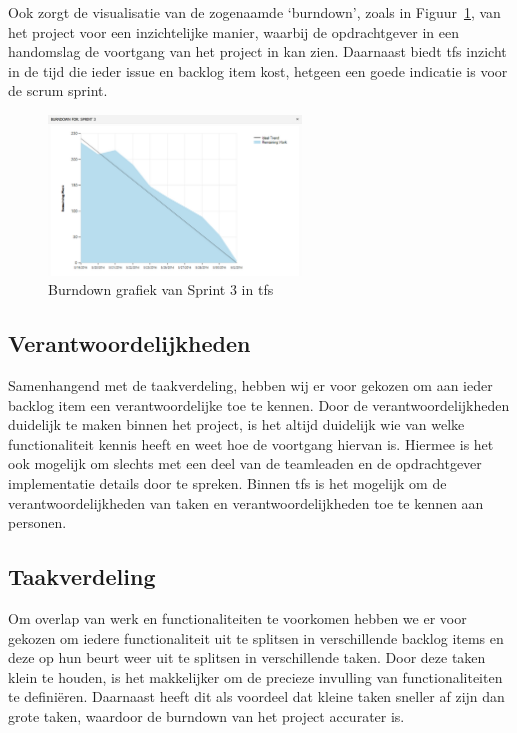 Ook zorgt de visualisatie van de zogenaamde `burndown', zoals in Figuur~\ref{fig:scrum-burndown}, van het project voor een inzichtelijke manier, waarbij de opdrachtgever in een handomslag de voortgang van het project in kan zien. Daarnaast biedt \ac{tfs} inzicht in de tijd die ieder issue en backlog item kost, hetgeen een goede indicatie is voor de scrum sprint. 

\begin{figure}[H]
  \begin{center}
    \includegraphics[width=0.6\textwidth]{style/images/screenshots/Burndown}
  \end{center}
  \caption{Burndown grafiek van Sprint 3 in \ac{tfs}}
  \label{fig:scrum-burndown}
\end{figure}

\subsection{Verantwoordelijkheden}
Samenhangend met de taakverdeling, hebben wij er voor gekozen om aan ieder backlog item een verantwoordelijke toe te kennen. Door de verantwoordelijkheden duidelijk te maken binnen het project, is het altijd duidelijk wie van welke functionaliteit kennis heeft en weet hoe de voortgang hiervan is. Hiermee is het ook mogelijk om slechts met een deel van de teamleaden en de opdrachtgever implementatie details door te spreken. Binnen \ac{tfs} is het mogelijk om de verantwoordelijkheden van taken en verantwoordelijkheden toe te kennen aan personen.

\subsection{Taakverdeling}
Om overlap van werk en functionaliteiten te voorkomen hebben we er voor gekozen om iedere functionaliteit uit te splitsen in verschillende backlog items en deze op hun beurt weer uit te splitsen in verschillende taken. Door deze taken klein te houden, is het makkelijker om de precieze invulling van functionaliteiten te definiëren. Daarnaast heeft dit als voordeel dat kleine taken sneller af zijn dan grote taken, waardoor de burndown van het project accurater is.


